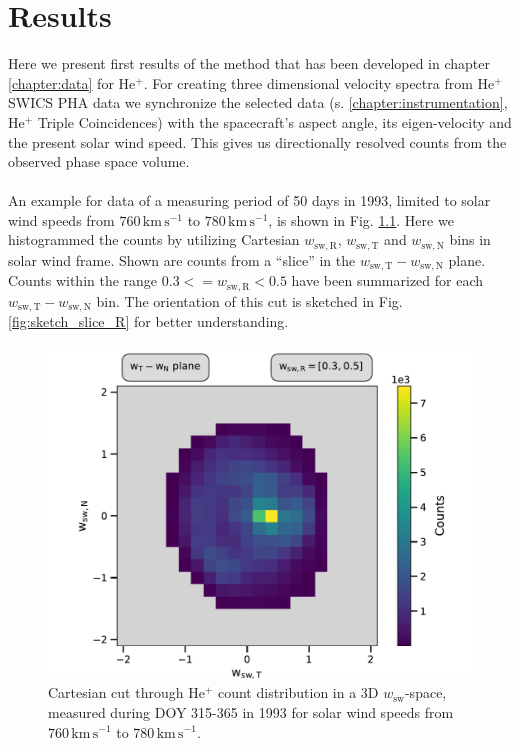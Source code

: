 
\chapter{Results} %
\label{chap:results}
%
%
%
Here we present first results of the method that has been developed in chapter \ref{chapter:data} for $\mathrm{He^{+}}$. For creating three dimensional velocity spectra from $\mathrm{He^{+}}$ SWICS PHA data we synchronize the selected data (s. \ref{chapter:instrumentation}, $\mathrm{He^{+}}$ Triple Coincidences) with the spacecraft's aspect angle, its eigen-velocity and the present solar wind speed.
This gives us directionally resolved counts from the observed phase space volume.
\\ \\
An example for data of a measuring period of 50 days in 1993, limited to solar wind speeds from $760 \, \mathrm{km\,s^{-1}}$ to $780 \, \mathrm{km\,s^{-1}}$, is shown in Fig. \ref{fig:counts_50}. Here we histogrammed the counts by utilizing Cartesian $w_{\mathrm{sw,R}}$, $w_\mathrm{sw,T}$ and $w_\mathrm{sw,N}$ bins in solar wind frame. Shown are counts from a ``slice'' in the $w_\mathrm{sw,T} - w_\mathrm{sw,N}$ plane. Counts within the range $0.3 <= w_\mathrm{sw,R} < 0.5$ have been summarized for each $w_\mathrm{sw,T} - w_\mathrm{sw,N}$ bin. The orientation of this cut is sketched in Fig. \ref{fig:sketch_slice_R} for better understanding.\\
\begin{figure}[h]
	\includegraphics[width=.85\textwidth]{Figures/slice_50_counts.pdf}
	\centering
	\caption{Cartesian cut through $\mathrm{He^{+}}$ count distribution in a 3D $w_\mathrm{sw}$-space, measured during DOY 315-365 in 1993 for solar wind speeds from $760 \, \mathrm{km\,s^{-1}}$ to $780 \, \mathrm{km\,s^{-1}}$.}
	\label{fig:counts_50}
\end{figure}
